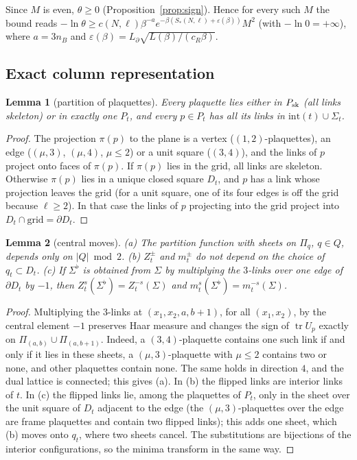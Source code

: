 \documentclass[11pt,a4paper]{article}
\newtheorem{lemma}{Lemma}[section]
\theoremstyle{definition}
\theoremstyle{remark}
\newcommand{\tr}{\operatorname{tr}}
\begin{document}
Since $M$ is even, $\theta\ge0$ (Proposition~\ref{prop:sign}).
Hence for every such $M$ the bound reads $-\ln\theta\ge c(N,\ell)\beta^{-a}e^{-\beta(S_*(N,\ell)+\varepsilon(\beta))}M^2$ (with $-\ln0=+\infty$), where $a=3n_B$ and $\varepsilon(\beta)=L_\partial\sqrt{L(\beta)/(c_R\beta)}$.

\subsection{Exact column representation}

\begin{lemma}[partition of plaquettes]\label{lem:partition}
Every plaquette lies either in $P_{\rm sk}$ (all links skeleton) or in exactly one $P_t$, and every $p\in P_t$ has all its links in $\mathrm{int}(t)\cup\Sigma_t$.
\end{lemma}
\begin{proof}
The projection $\pi(p)$ to the plane is a vertex ($(1,2)$-plaquettes), an edge ($(\mu,3)$, $(\mu,4)$, $\mu\le2$) or a unit square ($(3,4)$), and the links of $p$ project onto faces of $\pi(p)$.
If $\pi(p)$ lies in the grid, all links are skeleton.
Otherwise $\pi(p)$ lies in a unique closed square $D_t$, and $p$ has a link whose projection leaves the grid (for a unit square, one of its four edges is off the grid because $\ell\ge2$).
In that case the links of $p$ projecting into the grid project into $D_t\cap\text{grid}=\partial D_t$.
\end{proof}

\begin{lemma}[central moves]\label{lem:moves}
(a) The partition function with sheets on $\Pi_q$, $q\in Q$, depends only on $|Q|\bmod2$.
(b) $Z^\pm_t$ and $m^\pm_t$ do not depend on the choice of $q_t\subset D_t$.
(c) If $\Sigma^\flat$ is obtained from $\Sigma$ by multiplying the $3$-links over one edge of $\partial D_t$ by $-1$, then $Z^s_t(\Sigma^\flat)=Z^{-s}_t(\Sigma)$ and $m^s_t(\Sigma^\flat)=m^{-s}_t(\Sigma)$.
\end{lemma}
\begin{proof}
Multiplying the $3$-links at $(x_1,x_2,a,b+1)$, for all $(x_1,x_2)$, by the central element $-1$ preserves Haar measure and changes the sign of $\tr U_p$ exactly on $\Pi_{(a,b)}\cup\Pi_{(a,b+1)}$.
Indeed, a $(3,4)$-plaquette contains one such link if and only if it lies in these sheets, a $(\mu,3)$-plaquette with $\mu\le2$ contains two or none, and other plaquettes contain none.
The same holds in direction $4$, and the dual lattice is connected; this gives (a).
In (b) the flipped links are interior links of $t$.
In (c) the flipped links lie, among the plaquettes of $P_t$, only in the sheet over the unit square of $D_t$ adjacent to the edge (the $(\mu,3)$-plaquettes over the edge are frame plaquettes and contain two flipped links); this adds one sheet, which (b) moves onto $q_t$, where two sheets cancel.
The substitutions are bijections of the interior configurations, so the minima transform in the same way.
\end{proof}
\end{document}
